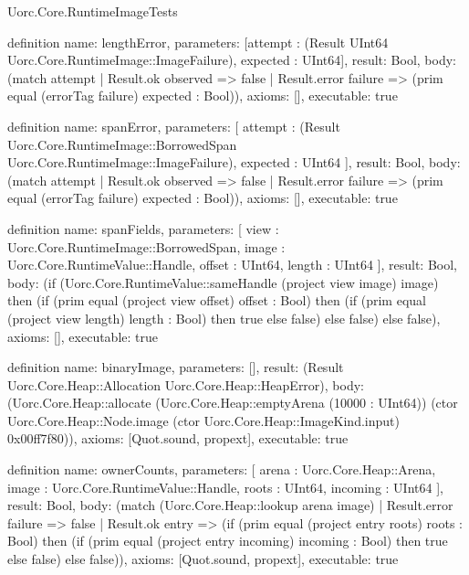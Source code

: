 \begin{lexlean}{Uorc.Core.RuntimeImageTests}
\begin{semanticmodule}
definition{
  name: lengthError,
  parameters: [attempt : (Result UInt64 Uorc.Core.RuntimeImage::ImageFailure), expected : UInt64],
  result: Bool,
  body: (match attempt
    | Result.ok observed => false
    | Result.error failure => (prim equal (errorTag failure) expected : Bool)),
  axioms: [],
  executable: true
}

definition{
  name: spanError,
  parameters: [
    attempt : (Result Uorc.Core.RuntimeImage::BorrowedSpan Uorc.Core.RuntimeImage::ImageFailure),
    expected : UInt64
  ],
  result: Bool,
  body: (match attempt
    | Result.ok observed => false
    | Result.error failure => (prim equal (errorTag failure) expected : Bool)),
  axioms: [],
  executable: true
}

definition{
  name: spanFields,
  parameters: [
    view : Uorc.Core.RuntimeImage::BorrowedSpan,
    image : Uorc.Core.RuntimeValue::Handle,
    offset : UInt64,
    length : UInt64
  ],
  result: Bool,
  body: (if (Uorc.Core.RuntimeValue::sameHandle (project view image) image) then (if (prim equal (project view offset) offset : Bool) then (if (prim equal (project view length) length : Bool) then true else false) else false) else false),
  axioms: [],
  executable: true
}

definition{
  name: binaryImage,
  parameters: [],
  result: (Result Uorc.Core.Heap::Allocation Uorc.Core.Heap::HeapError),
  body: (Uorc.Core.Heap::allocate (Uorc.Core.Heap::emptyArena (10000 : UInt64)) (ctor Uorc.Core.Heap::Node.image (ctor Uorc.Core.Heap::ImageKind.input) 0x00ff7f80)),
  axioms: [Quot.sound, propext],
  executable: true
}

definition{
  name: ownerCounts,
  parameters: [
    arena : Uorc.Core.Heap::Arena,
    image : Uorc.Core.RuntimeValue::Handle,
    roots : UInt64,
    incoming : UInt64
  ],
  result: Bool,
  body: (match (Uorc.Core.Heap::lookup arena image)
    | Result.error failure => false
    | Result.ok entry => (if (prim equal (project entry roots) roots : Bool) then (if (prim equal (project entry incoming) incoming : Bool) then true else false) else false)),
  axioms: [Quot.sound, propext],
  executable: true
}


\end{semanticmodule}
\end{lexlean}
